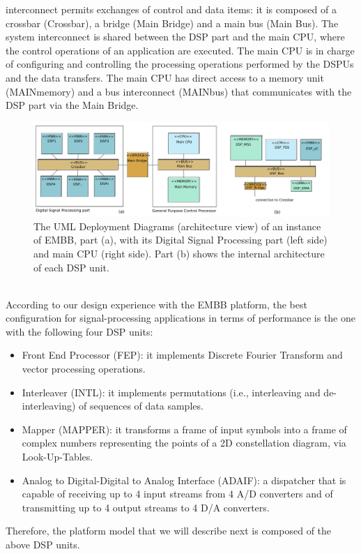 \documentclass{llncs}
\begin{document}
interconnect permits exchanges of control and data items: it is composed of a crossbar (Crossbar), a bridge (Main
Bridge) and a main bus (Main Bus).
%
The system interconnect is shared between the DSP part and the main CPU, where the control operations of an application
are executed. The main CPU is in charge of configuring and controlling the processing operations performed by the DSPUs
and the data transfers. The main CPU has direct access to a memory unit (MAINmemory) and a bus interconnect (MAINbus)
that communicates with the DSP part via the Main Bridge.
%
\begin{figure}[!htbp]
	\centering
	\includegraphics[width=\textwidth]{figures/Embb_BlockDiagram.pdf}
    \caption{The UML Deployment Diagrams (architecture view) of an instance of EMBB, part (a), with its Digital Signal
    Processing part (left side) and main CPU (right side). Part (b) shows the internal architecture of each DSP unit.}
 	\label{fig:EmbbArch}
\end{figure}
%
\\According to our design experience with the EMBB platform, the best configuration for signal-processing applications in
terms of performance is the one with the following four DSP units:
%
\begin{itemize}
	\item Front End Processor (FEP): it implements Discrete Fourier Transform and vector processing operations.
	\item Interleaver (INTL): it implements permutations (i.e., interleaving and de-interleaving) of sequences of data
	samples.
	\item Mapper (MAPPER): it transforms a frame of input symbols into a frame of complex numbers representing the
	points of a 2D constellation diagram, via Look-Up-Tables.
	\item Analog to Digital-Digital to Analog Interface (ADAIF): a dispatcher that is capable of receiving up to 4 input
	streams from 4 A/D converters and of transmitting up to 4 output streams to 4 D/A converters.
\end{itemize}
%
Therefore, the platform model that we will describe next is composed of the above DSP units.
%
\end{document}
